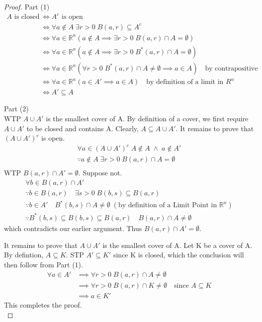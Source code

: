 \documentclass[11pt, oneside]{book}
\theoremstyle{break}
\newtheorem*{proof}{Proof}
\newcommand{\bb}[1]{\mathbb{#1}}			%
\begin{document}
\begin{proof}
	Part (1)
	\begin{align*}
		A \text{ is closed} &\iff A^c \text{ is open} \\
							&\iff \forall a \notin A \; \exists r > 0 \; B(a, r) \subseteq A^c \\
							&\iff \forall a \in \bb{R}^n (a \notin A \implies \exists r > 0 \; B(a, r) \cap A = \emptyset) \\
							&\iff \forall a \in \bb{R}^n (a \notin A \implies \exists r > 0 \; B^*(a, r) \cap A = \emptyset) \\
							&\iff \forall a \in \bb{R}^n (\forall r > 0 \; B^*(a, r) \cap A \neq \emptyset \implies a \in A) \quad \text{by contrapositive} \\
							&\iff \forall a \in \bb{R}^n (a \in A' \implies a \in A) \quad \text{by definition of a limit in $R^n$} \\
							&\iff A' \subseteq A
	\end{align*}

	Part (2) \\
	WTP $A \cup A'$ is the smallest cover of A. By definition of a cover, we first require $A \cup A'$ to be closed and contains A. Clearly, $A \subseteq A \cup A'$. It remains to prove that $(A \cup A')^c$ is open.
	\begin{gather*}
		\forall a \in (A \cup A')^c \; A \notin A \; \land \; a \notin A' \\
		\because a \notin A \; \exists r > 0 \; B(a, r) \cap A = \emptyset \\
	\end{gather*}
	WTP $B(a, r) \cap A' = \emptyset$. Suppose not.
	\begin{gather*}
		\forall b \in B(a, r) \cap A' \\
		\because b \in B(a, r) \quad \exists s > 0 \; B(b, s) \subseteq B(a, r) \\
		\because b \in A' \quad B^*(b, s) \cap A \neq \emptyset \; (\text{by definition of a Limit Point in $\bb{R}^n$}) \\
		\because B^*(b, s) \subseteq B(b, s) \subseteq B(a, r) \quad B(a, r) \cap A \neq \emptyset
	\end{gather*}
	which contradicts our earlier argument. Thus $B(a, r) \cap A' = \emptyset$.

	It remains to prove that $A \cup A'$ is the smallest cover of A. Let K be a cover of A. By defintion, $A \subseteq K$. STP $A' \subseteq K'$ since K is closed, which the conclusion will then follow from Part (1).
	\begin{align*}
		\forall a \in A' &\implies \forall r > 0 \; B(a, r) \cap A \neq \emptyset \\
						 &\implies \forall r > 0 \; B(a, r) \cap K \neq \emptyset \quad \text{since } A \subseteq K \\
						 &\implies a \in K'
	\end{align*}
	This completes the proof. \\


\end{proof}
\end{document}
